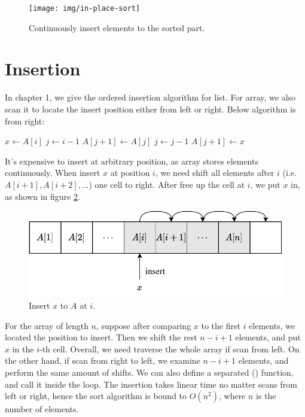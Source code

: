 \documentclass[b5paper]{article}
\begin{document}
\begin{figure}[htbp]
  \centering
  \texttt{[image: img/in-place-sort]}
  \caption{Continuously insert elements to the sorted part.}
  \label{fig:in-place-sort}
\end{figure}

\section{Insertion}

In chapter 1, we give the ordered insertion algorithm for list. For array, we also scan it to locate the insert position either from left or right. Below algorithm is from right:

\begin{algorithmic}[1]
    \State $x \gets A[i]$ 
    \State $j \gets i-1$
      \State $A[j+1] \gets A[j]$
      \State $j \gets j - 1$
    \EndWhile
    \State $A[j+1] \gets x$
  \EndFor
\EndFunction
\end{algorithmic}

It's expensive to insert at arbitrary position, as array stores elements continuously. When insert $x$ at position $i$, we need shift all elements after $i$ (i.e. $A[i + 1], A[i + 2], ...$) one cell to right. After free up the cell at $i$, we put $x$ in, as shown in figure \ref{fig:array-shift}.

\begin{figure}[htbp]
  \centering
  \includegraphics[scale=0.7]{img/array-shift}
  \caption{Insert $x$ to $A$ at $i$.}
  \label{fig:array-shift}
\end{figure}

For the array of length $n$, suppose after comparing $x$ to the first $i$ elements, we located the position to insert. Then we shift the rest $n - i + 1$ elements, and put $x$ in the $i$-th cell. Overall, we need traverse the whole array if scan from left. On the other hand, if scan from right to left, we examine $n - i + 1$ elements, and perform the same amount of shifts. We can also define a separated () function, and call it inside the loop. The insertion takes linear time no matter scans from left or right, hence the sort algorithm is bound to $O(n^2)$, where $n$ is the number of elements.
\end{document}
